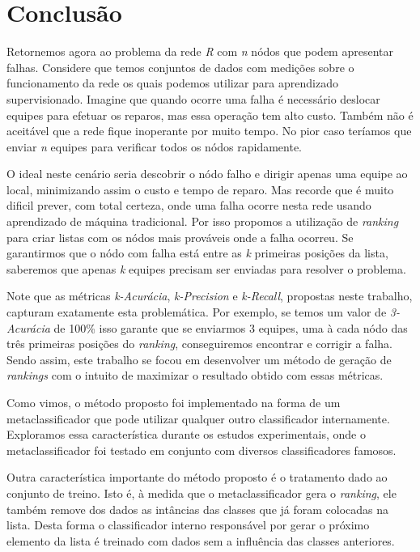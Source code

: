 \chapter{Conclusão}

Retornemos agora ao problema da rede \textit{R} com \textit{n} nódos que podem apresentar falhas.
Considere que temos conjuntos de dados com medições sobre o funcionamento da rede os quais podemos utilizar para aprendizado supervisionado.
Imagine que quando ocorre uma falha é necessário deslocar equipes para efetuar os reparos, mas essa operação tem alto custo.
Também não é aceitável que a rede fique inoperante por muito tempo.
No pior caso teríamos que enviar \textit{n} equipes para verificar todos os nódos rapidamente.

O ideal neste cenário seria descobrir o nódo falho e dirigir apenas uma equipe ao local, minimizando assim o custo e tempo de reparo.
Mas recorde que é muito dificil prever, com total certeza, onde uma falha ocorre nesta rede usando aprendizado de máquina tradicional.
Por isso propomos a utilização de \textit{ranking} para criar listas com os nódos mais prováveis onde a falha ocorreu.
Se garantirmos que o nódo com falha está entre as \textit{k} primeiras posições da lista, saberemos que apenas \textit{k} equipes precisam ser enviadas para resolver o problema.

Note que as métricas \textit{k-Acurácia}, \textit{k-Precision} e \textit{k-Recall}, propostas neste trabalho, capturam exatamente esta problemática.
Por exemplo, se temos um valor de \textit{3-Acurácia} de 100\% isso garante que se enviarmos 3 equipes, uma à cada  nódo das três primeiras posições do \textit{ranking}, conseguiremos encontrar e corrigir a falha.
Sendo assim, este trabalho se focou em desenvolver um método de geração de \textit{rankings} com o intuito de maximizar o resultado obtido com essas métricas.

Como vimos, o método proposto foi implementado na forma de um metaclassificador que pode utilizar qualquer outro classificador internamente.
Exploramos essa característica durante os estudos experimentais, onde o metaclassificador foi testado em conjunto com diversos classificadores famosos.

Outra característica importante do método proposto é o tratamento dado ao conjunto de treino.
Isto é, à medida que o metaclassificador gera o \textit{ranking}, ele também remove dos dados as intâncias das classes que já foram colocadas na lista.
Desta forma o classificador interno responsável por gerar o próximo elemento da lista é treinado com dados sem a influência das classes anteriores.

